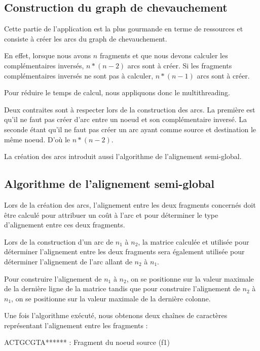 \documentclass[12pt,a4paper,final]{article}
\begin{document}
\subsection{Construction du graph de chevauchement}

Cette partie de l'application est la plus gourmande en terme de ressources et consiste à créer les arcs du graph de chevauchement.\medskip

En effet, lorsque nous avons $n$ fragments et que nous devons calculer les complémentaires inversés, $n*(n-2)$ arcs sont à créer.  Si les fragments complémentaires inversés ne sont pas à calculer, $n*(n-1)$ arcs sont à créer.\medskip

Pour réduire le temps de calcul, nous appliquons donc le multithreading.\medskip

Deux contraites sont à respecter lors de la construction des arcs.  La première est qu'il ne faut pas créer d'arc entre un noeud et son complémentaire inversé.  La seconde étant qu'il ne faut pas créer un arc ayant comme source et destination le même noeud.  D'où le $n*(n-2)$.\medskip

La création des arcs introduit aussi l'algorithme de l'alignement semi-global.\medskip

\subsection{Algorithme de l'alignement semi-global}

Lors de la création des arcs, l'alignement entre les deux fragments concernés doit être calculé pour attribuer un coût à l'arc et pour déterminer le type d'alignement entre ces deux fragments.\medskip

Lors de la construction d'un arc de $n_1$ à $n_2$, la matrice calculée et utilisée pour déterminer l'alignement entre les deux fragments sera également utilisée pour déterminer l'alignement de l'arc allant de $n_2$ à $n_1$.\medskip

Pour construire l'alignement de $n_1$ à $n_2$, on se positionne sur la valeur maximale de la dernière ligne de la matrice tandis que pour construire l'alignement de $n_2$ à $n_1$, on se positionne sur la valeur maximale de la dernière colonne.\medskip

Une fois l'algorithme exécuté, nous obtenons deux chaînes de caractères représentant l'alignement entre les fragments : \medskip

ACTGCGTA****** : Fragment du noeud source (f1)\medskip
\end{document}
